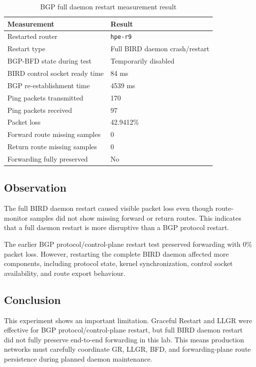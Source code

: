 \begin{table}[H]
\centering
\small
\renewcommand{\arraystretch}{1.25}
\begin{tabular}{|p{6cm}|p{5cm}|}
\hline
\textbf{Measurement} & \textbf{Result} \\
\hline
Restarted router & \texttt{hpe-r9} \\
\hline
Restart type & Full BIRD daemon crash/restart \\
\hline
BGP-BFD state during test & Temporarily disabled \\
\hline
BIRD control socket ready time & 84 ms \\
\hline
BGP re-establishment time & 4539 ms \\
\hline
Ping packets transmitted & 170 \\
\hline
Ping packets received & 97 \\
\hline
Packet loss & 42.9412\% \\
\hline
Forward route missing samples & 0 \\
\hline
Return route missing samples & 0 \\
\hline
Forwarding fully preserved & No \\
\hline
\end{tabular}
\caption{BGP full daemon restart measurement result}
\end{table}

\subsection{Observation}

The full BIRD daemon restart caused visible packet loss even though route-monitor samples did not show missing forward or return routes. This indicates that a full daemon restart is more disruptive than a BGP protocol restart.

The earlier BGP protocol/control-plane restart test preserved forwarding with 0\% packet loss. However, restarting the complete BIRD daemon affected more components, including protocol state, kernel synchronization, control socket availability, and route export behaviour.

\subsection{Conclusion}

This experiment shows an important limitation. Graceful Restart and LLGR were effective for BGP protocol/control-plane restart, but full BIRD daemon restart did not fully preserve end-to-end forwarding in this lab. This means production networks must carefully coordinate GR, LLGR, BFD, and forwarding-plane route persistence during planned daemon maintenance.
